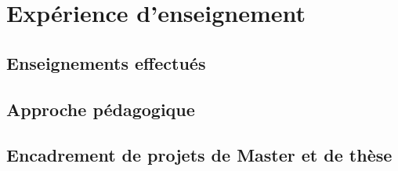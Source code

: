 


\chapter{Exp\'erience d'enseignement} 

\section{Enseignements effectu\'es}

\pg


\section{Approche p\'edagogique}

\pg



\section{Encadrement de projets de Master et de th\`ese}